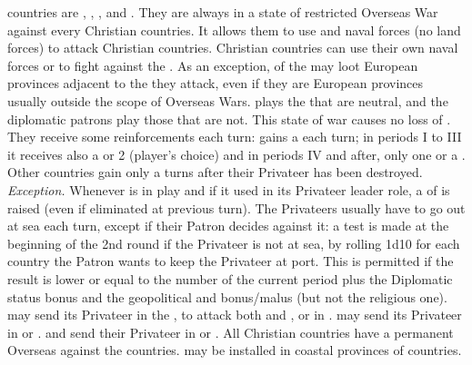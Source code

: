 \label{chSpecific:Barbaresques}
 countries are , ,
,  and . They are always in a
state of restricted Overseas War against every Christian countries.
\bparag It allows them to use \corsaire and naval forces (no land
forces) to attack Christian countries. Christian countries can use their
own naval forces or \Presidios to fight against the
.
\bparag As an exception, \corsaire of the  may loot
European provinces adjacent to the \STZ they attack, even if they are
European provinces usually outside the scope of Overseas Wars.
\bparag \TUR plays the  that are neutral, and the
diplomatic patrons play those that are not.
\bparag This state of war causes no loss of \STAB.
\bparag[Reinforcements] They receive some reinforcements each turn:
 gains a \corsaire\facemoins each turn; in periods I to
III it receives also a \ND or 2 \NGD (player's choice) and in periods IV
and after, only one \NGD or a \NDE. Other countries gain only a
\corsaire{} turns after their Privateer has been destroyed.
\bparag \textit{Exception.} Whenever  is in play and if
it used in its Privateer leader role, a \corsaire\facemoins of
 is raised (even if eliminated at previous turn).
 The Privateers usually have to go out at
sea each turn, except if their Patron decides against it: a test is made
at the beginning of the 2nd round if the Privateer is not at sea, by
rolling 1d10 for each country the Patron wants to keep the Privateer at
port.  This is permitted if the result is lower or equal to the number
of the current period plus the Diplomatic status bonus and the
geopolitical and bonus/malus (but not the religious one).
\bparag {} may send its Privateer in the
, to attack both  and ,
or in .
\bparag {} may send its Privateer in  or
.
\bparag {} and  send their Privateer in
 or .
\aparag All Christian countries have a permanent Overseas \CB against
the  countries.
\aparag \Presidios may be installed in coastal provinces of
 countries.

